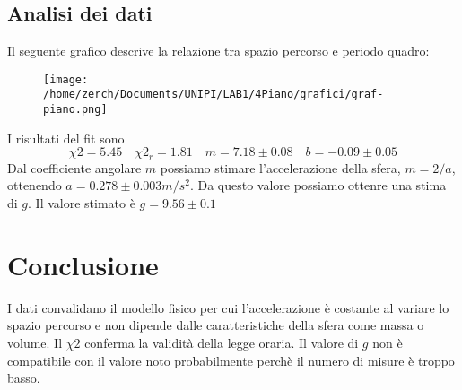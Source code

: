 \documentclass[a4paper,10pt]{article}
\begin{document}
\subsection{Analisi dei dati}

Il seguente grafico descrive la relazione tra spazio percorso e periodo quadro:

 \begin{figure}[!htb]
\begin{center}
\texttt{[image: /home/zerch/Documents/UNIPI/LAB1/4Piano/grafici/graf-piano.png]}
\end{center}
\end{figure}
I risultati del fit sono 
\begin{equation}
\chi2=5.45 \quad \chi2_r=1.81 \quad m=7.18\pm0.08 \quad b=-0.09\pm 0.05
\end{equation}
Dal coefficiente angolare $m$ possiamo stimare l'accelerazione della sfera, $m=2/a$, ottenendo $a=0.278\pm0.003m/s^2$. 
Da questo valore possiamo ottenre una stima di $g$. Il valore stimato è $g=9.56\pm0.1$


\section{Conclusione}
I dati convalidano il modello fisico per cui l'accelerazione è costante al variare lo spazio percorso e non dipende dalle caratteristiche della sfera come massa o volume. 
Il $\chi2$ conferma la validità della legge oraria. Il valore di $g$ non è compatibile con il valore noto probabilmente perchè il numero di misure è troppo basso.

\end{document}
